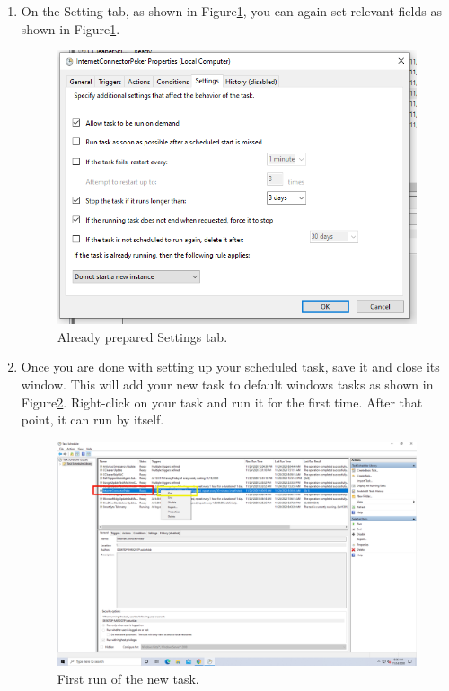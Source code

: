 \begin{enumerate}
 \item On the Setting tab, as shown in Figure\ref{fig:TaskSettings}, you can again
 set relevant fields as shown in Figure\ref{fig:TaskSettings}.
	\begin{figure}[H]
		\centering
		\includegraphics[angle=0,origin=c,width = .8\linewidth]{Section_Ethernet/Figures/TaskCreationSettings.png}
		\caption{Already prepared Settings tab.}
		\label{fig:TaskSettings}
	\end{figure}

 \item Once you are done with setting up your scheduled task, save it and close its
 window. This will add your new task to default windows tasks as shown in 
 Figure\ref{fig:TaskRun}. Right-click on your task and run it for the first time.
 After that point, it can run by itself.
	\begin{figure}[H]
		\centering
		\includegraphics[angle=0,origin=c,width = .8\linewidth]{Section_Ethernet/Figures/TaskRun.png}
		\caption{First run of the new task.}
		\label{fig:TaskRun}
	\end{figure}
\end{enumerate}

